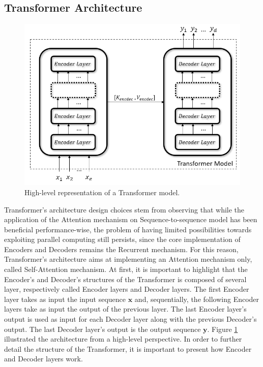         \subsection{Transformer Architecture}
        \label{sub:transformer}
        \begin{figure}[!t]
                \centering
                \includegraphics[width=15cm, keepaspectratio]{images/an/transformer.png}
                \caption{High-level representation of a Transformer model.}
                \label{fig:an_transformer}
        \end{figure}
        
            Transformer's architecture design choices stem from observing that while the application of the Attention mechanism on Sequence-to-sequence model has been beneficial performance-wise, the problem of having limited possibilities towards exploiting parallel computing still persists, since the core implementation of Encoders and Decoders remains the Recurrent mechanism. For this reason, Transformer's architecture aims at implementing an Attention mechanism only, called Self-Attention mechanism.\newline
            At first, it is important to highlight that the Encoder's and Decoder's structures of the Transformer is composed of several layer, respectively called Encoder layers and Decoder layers. The first Encoder layer takes as input the input sequence $\mathbf{x}$ and, sequentially, the following Encoder layers take as input the output of the previous layer. The last Encoder layer's output is used as input for each Decoder layer along with the previous Decoder's output. The last Decoder layer's output is the output sequence $\mathbf{y}$. Figure \ref{fig:an_transformer} illustrated the architecture from a high-level perspective. In order to further detail the structure of the Transformer, it is important to present how Encoder and Decoder layers work.
            
